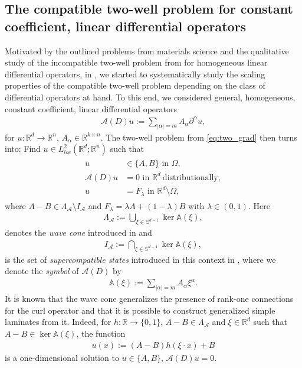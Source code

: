 \documentclass[a4paper, 10pt, twoside, notitlepage]{amsart}
\theoremstyle{plain}
\newcommand{\R}{\mathbb{R}}
\newcommand{\A}{\mathcal{A}}
\renewcommand{\AA}{\mathbb{A}}
\begin{document}
	
	\subsection{The compatible two-well problem for constant coefficient, linear differential operators}
	Motivated by the outlined problems from materials science and the qualitative study of the incompatible two-well problem from \cite{DPPR18} for homogeneous linear differential operators,
	in \cite{RRT23}, we started to systematically study the scaling properties of the compatible two-well problem depending on the class of differential operators at
	hand. To this end, we considered general, homogeneous, constant coefficient, linear differential operators
	\begin{align*}
		\A(D)u:= \sum\limits_{|\alpha|=m} A_{\alpha} \partial^\alpha u,
	\end{align*}
	for $u: \R^d \rightarrow \R^n$, $A_{\alpha} \in \R^{k \times n}$.  The two-well problem from \cref{eq:two_grad} then turns into:  Find $u \in
		L^2_{loc}(\R^d;\R^n)$ such that
	\begin{align}
		\label{eq:two_well_gen}
		\begin{split}
			u& \in \{A,B\} \mbox{ in } \Omega,\\
			\A(D) u &= 0 \mbox{ in } \R^d \ \text{distributionally},\\
			u& = F_{\lambda} \mbox{ in } \R^d \setminus \overline{\Omega},
		\end{split}
	\end{align}
	where $A-B \in \Lambda_{\A} \setminus I_{\A}$ and $F_{\lambda} = \lambda A + (1-\lambda) B$ with $\lambda \in (0,1)$. Here
	\begin{align} \label{eq:wave_cone}
		\Lambda_{\A}:= \bigcup\limits_{\xi \in \mathbb{S}^{d-1}}\ker \AA(\xi),
	\end{align}
	denotes the \emph{wave cone} introduced in \cite{T79,Mur81} and
	\begin{align} \label{eq:super_compatible}
		I_{\A}:= \bigcap\limits_{\xi \in \mathbb{S}^{d-1}} \ker \AA(\xi),
	\end{align}
	is the set of \emph{supercompatible states} introduced in this context in \cite{RRT23}, where we denote the \emph{symbol} of $\A(D)$ by
		\begin{align} \label{eq:symbol}
			\AA(\xi) := \sum_{|\alpha|=m} A_\alpha \xi^\alpha.
                \end{align}
              It is known that the wave cone generalizes the presence of rank-one connections for the curl operator and that it is possible to construct generalized simple laminates from it.
              Indeed, for $h:\R \to \{0,1\}$, $A-B \in \Lambda_{\A}$ and $\xi \in \R^d$ such that $A-B\in \ker \AA(\xi)$, the function
	\begin{align*}
		u(x):= (A-B) h(\xi \cdot x) + B
	\end{align*}
	is a one-dimensional solution to $u \in \{A,B\}$, $\A(D) u = 0$.
	
\end{document}
